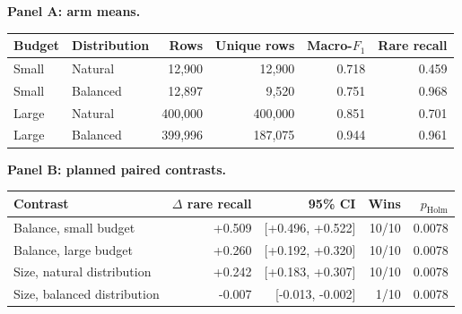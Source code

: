 \begin{minipage}{\linewidth}
\centering
\textbf{Panel A: arm means.}\\[3pt]
\begin{tabular}{@{}llrrrr@{}}
\toprule
Budget & Distribution & Rows & Unique rows & Macro-$F_1$ & Rare recall \\
\midrule
Small & Natural & 12,900 & 12,900 & 0.718 & 0.459 \\
Small & Balanced & 12,897 & 9,520 & 0.751 & 0.968 \\
Large & Natural & 400,000 & 400,000 & 0.851 & 0.701 \\
Large & Balanced & 399,996 & 187,075 & 0.944 & 0.961 \\
\bottomrule
\end{tabular}
\par\medskip
\textbf{Panel B: planned paired contrasts.}\\[3pt]
\begin{tabular}{@{}lrrrr@{}}
\toprule
Contrast & $\Delta$ rare recall & 95\% CI & Wins & $p_{\mathrm{Holm}}$ \\
\midrule
Balance, small budget & +0.509 & [+0.496, +0.522] & 10/10 & 0.0078 \\
Balance, large budget & +0.260 & [+0.192, +0.320] & 10/10 & 0.0078 \\
Size, natural distribution & +0.242 & [+0.183, +0.307] & 10/10 & 0.0078 \\
Size, balanced distribution & -0.007 & [-0.013, -0.002] & 1/10 & 0.0078 \\
\bottomrule
\end{tabular}
\end{minipage}